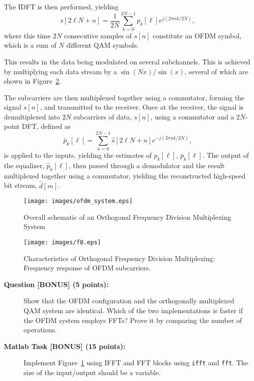 \documentclass[letterpaper,12pt]{article}
\newcounter{questioncnt}
\newcounter{matlabcnt}
\begin{document}
The IDFT is then performed, yielding
\begin{equation}
s[2\ell{N}+n]=\frac{1}{2N}\sum\limits_{k=0}^{2N-1}p_k[\ell]e^{j(2\pi{nk}/2N)},
\end{equation}where this time $2N$ consecutive samples of $s[n]$ constitute an
OFDM symbol, which is a sum of $N$ different QAM symbols.

This results in the data being modulated on several subchannels.
This is achieved by multiplying each data stream by a
$\sin(Nx)/\sin(x)$, several of which are shown in
Figure~\ref{freq_resp_ofdm}.

The subcarriers are then multiplexed together using a commutator,
forming the signal $s[n]$, and transmitted to the receiver. Once
at the receiver, the signal is demultiplexed into $2N$ subcarriers
of data, $\hat{s}[n]$, using a commutator and a $2N$-point DFT,
defined as
\begin{equation}
\bar{p}_k[\ell]=\sum\limits_{n=0}^{2N-1}\hat{s}[2\ell{N}+n]e^{-j(2\pi{nk}/2N)},
\end{equation}
is applied to the inputs, yielding the estimates of $p_k[\ell]$,
$\bar{p}_k[\ell]$. The output of the equalizer, $\hat{p}_k[\ell]$,
then passed through a demodulator and the result multiplexed
together using a commutator, yielding the reconstructed high-speed
bit stream, $\hat{d}[m]$.
\begin{figure}
\centering
\texttt{[image: images/ofdm\_system.eps]}
\caption{Overall schematic of an Orthogonal Frequency Division
Multiplexing System}\label{ofdmsys}
\end{figure}


\begin{figure}
\centering
\texttt{[image: images/f8.eps]}
\caption{Characteristics of Orthogonal Frequency Division
Multiplexing: Frequency response of OFDM
subcarriers.}\label{freq_resp_ofdm}
\end{figure}

\begin{description}
    \item[{\bf Question  [BONUS] (5 points):}]
    Show that the OFDM configuration and the orthogonally
    multiplexed QAM system are identical. Which of the two
    implementations is faster if the OFDM system employs FFTs?
    Prove it by comparing the number of operations.
\end{description}

\begin{description}
    \item[{\bf Matlab Task  [BONUS] (15 points):}]
    Implement Figure~\ref{ofdmsys} using IFFT and FFT blocks using {\tt ifft} and {\tt fft}. The
    size of the input/output should be a variable.
\end{description}
\end{document}
